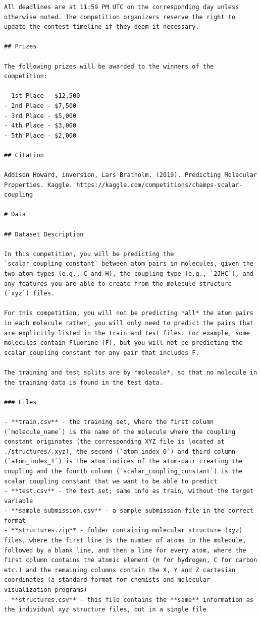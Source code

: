 \documentclass{article} %
\begin{document}
\begin{tcolorbox}[colback=lightgray!10, colframe=black, width=\textwidth, arc=2mm, boxrule=0.5mm, title=The original description for champs-scalar-coupling, breakable]
\begin{lstlisting}[basicstyle=\tiny\ttfamily, breaklines=true]
All deadlines are at 11:59 PM UTC on the corresponding day unless otherwise noted. The competition organizers reserve the right to update the contest timeline if they deem it necessary.

## Prizes

The following prizes will be awarded to the winners of the competition:

- 1st Place - $12,500
- 2nd Place - $7,500
- 3rd Place - $5,000
- 4th Place - $3,000
- 5th Place - $2,000

## Citation

Addison Howard, inversion, Lars Bratholm. (2019). Predicting Molecular Properties. Kaggle. https://kaggle.com/competitions/champs-scalar-coupling

# Data

## Dataset Description

In this competition, you will be predicting the `scalar_coupling_constant` between atom pairs in molecules, given the two atom types (e.g., C and H), the coupling type (e.g., `2JHC`), and any features you are able to create from the molecule structure (`xyz`) files.

For this competition, you will not be predicting *all* the atom pairs in each molecule rather, you will only need to predict the pairs that are explicitly listed in the train and test files. For example, some molecules contain Fluorine (F), but you will not be predicting the scalar coupling constant for any pair that includes F.

The training and test splits are by *molecule*, so that no molecule in the training data is found in the test data.

### Files

- **train.csv** - the training set, where the first column (`molecule_name`) is the name of the molecule where the coupling constant originates (the corresponding XYZ file is located at ./structures/.xyz), the second (`atom_index_0`) and third column (`atom_index_1`) is the atom indices of the atom-pair creating the coupling and the fourth column (`scalar_coupling_constant`) is the scalar coupling constant that we want to be able to predict
- **test.csv** - the test set; same info as train, without the target variable
- **sample_submission.csv** - a sample submission file in the correct format
- **structures.zip** - folder containing molecular structure (xyz) files, where the first line is the number of atoms in the molecule, followed by a blank line, and then a line for every atom, where the first column contains the atomic element (H for hydrogen, C for carbon etc.) and the remaining columns contain the X, Y and Z cartesian coordinates (a standard format for chemists and molecular visualization programs)
- **structures.csv** - this file contains the **same** information as the individual xyz structure files, but in a single file


\end{lstlisting}
\end{tcolorbox}
\end{document}
